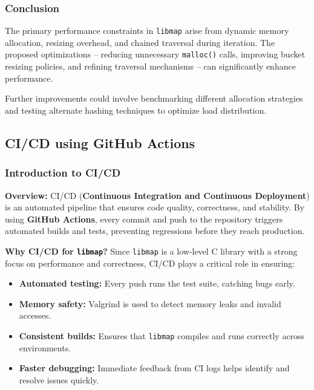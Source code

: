 \documentclass[titlepage]{article}
\begin{document}
\subsubsection{Conclusion}

The primary performance constraints in \texttt{libmap} arise from dynamic memory allocation, resizing overhead, and chained traversal during iteration. The proposed optimizations -- reducing unnecessary \texttt{malloc()} calls, improving bucket resizing policies, and refining traversal mechanisms -- can significantly enhance performance.

Further improvements could involve benchmarking different allocation strategies and testing alternate hashing techniques to optimize load distribution.

\subsection{CI/CD using GitHub Actions}

\subsubsection{Introduction to CI/CD}

\textbf{Overview:}  
CI/CD (\textbf{Continuous Integration and Continuous Deployment}) is an automated pipeline that ensures code quality, correctness, and stability. By using \textbf{GitHub Actions}, every commit and push to the repository triggers automated builds and tests, preventing regressions before they reach production.

\textbf{Why CI/CD for \texttt{libmap}?}  
Since \texttt{libmap} is a low-level C library with a strong focus on performance and correctness, CI/CD plays a critical role in ensuring:  
\begin{itemize}  
    \item \textbf{Automated testing:} Every push runs the test suite, catching bugs early.  
    \item \textbf{Memory safety:} Valgrind is used to detect memory leaks and invalid accesses.  
    \item \textbf{Consistent builds:} Ensures that \texttt{libmap} compiles and runs correctly across environments.  
    \item \textbf{Faster debugging:} Immediate feedback from CI logs helps identify and resolve issues quickly.  
\end{itemize}  
\end{document}
